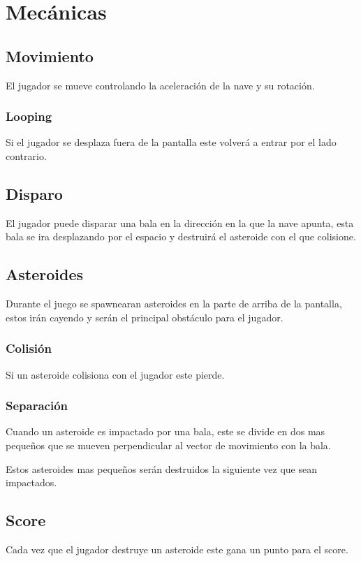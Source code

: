 \documentclass[journal]{IEEEtran}
\begin{document}
\section*{Mecánicas}

\subsection*{Movimiento}
El jugador se mueve controlando la aceleración de la nave y su rotación.

\subsubsection*{Looping}
Si el jugador se desplaza fuera de la pantalla este volverá a entrar por el
lado contrario.

\subsection*{Disparo}
El jugador puede disparar una bala en la dirección en la que la nave apunta,
esta bala se ira desplazando por el espacio y destruirá el asteroide con el que
colisione.

\subsection*{Asteroides}
Durante el juego se spawnearan asteroides en la parte de arriba de la pantalla,
estos irán cayendo y serán el principal obstáculo para el jugador.

\subsubsection*{Colisión}
Si un asteroide colisiona con el jugador este pierde.

\subsubsection*{Separación}
Cuando un asteroide es impactado por una bala, este se divide en dos mas
pequeños que se mueven perpendicular al vector de movimiento con la bala.

Estos asteroides mas pequeños serán destruidos la siguiente vez que sean
impactados.

\subsection*{Score}
Cada vez que el jugador destruye un asteroide este gana un punto para el
score.
\end{document}
